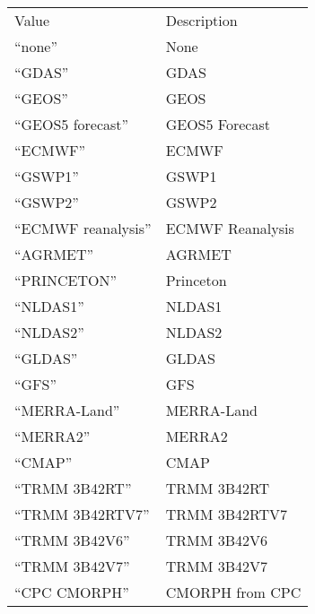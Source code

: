  \begin{tabular}{ll}
 Value                         & Description                        \\
 ``none''                      & None                               \\
 ``GDAS''                      & GDAS                               \\
 ``GEOS''                      & GEOS                               \\
 ``GEOS5 forecast''            & GEOS5 Forecast                     \\
 ``ECMWF''                     & ECMWF                              \\
 ``GSWP1''                     & GSWP1                              \\
 ``GSWP2''                     & GSWP2                              \\
 ``ECMWF reanalysis''          & ECMWF Reanalysis                   \\
 
 ``AGRMET''                    & AGRMET                             \\
 
 ``PRINCETON''                 & Princeton                          \\
 ``NLDAS1''                    & NLDAS1                             \\
 ``NLDAS2''                    & NLDAS2                             \\
 ``GLDAS''                     & GLDAS                              \\
 ``GFS''                       & GFS                                \\
 ``MERRA-Land''                & MERRA-Land                         \\
 ``MERRA2''                    & MERRA2                             \\
 ``CMAP''                      & CMAP                               \\
 ``TRMM 3B42RT''               & TRMM 3B42RT                        \\
 ``TRMM 3B42RTV7''             & TRMM 3B42RTV7                      \\
 ``TRMM 3B42V6''               & TRMM 3B42V6                        \\
 ``TRMM 3B42V7''               & TRMM 3B42V7                        \\
 ``CPC CMORPH''                & CMORPH from CPC                    \\
 

\end{tabular}
